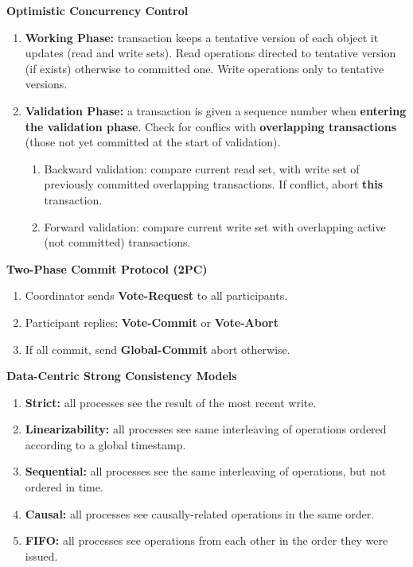 \documentclass[a4paper, 10pt, twocolumn]{article}
\begin{document}
    \textbf{Optimistic Concurrency Control}

    \begin{enumerate}
        \item \textbf{Working Phase:} transaction keeps a tentative version of each object it updates (read and write sets).
            Read operations directed to tentative version (if exists) otherwise to committed one.
            Write operations only to tentative versions.
        \item \textbf{Validation Phase:} a transaction is given a sequence number when \textbf{entering the validation phase}.
            Check for conflics with \textbf{overlapping transactions} (those not yet committed at the start of validation).
            \begin{enumerate}
                \item Backward validation: compare current read set, with write set of previously committed overlapping transactions.
                    If conflict, abort \textbf{this} transaction.
                \item Forward validation: compare current write set with overlapping active (not committed) transactions.
            \end{enumerate}
    \end{enumerate}

    \textbf{Two-Phase Commit Protocol (2PC)}
    \begin{enumerate}
        \item Coordinator sends \textbf{Vote-Request} to all participants.
        \item Participant replies: \textbf{Vote-Commit} or \textbf{Vote-Abort}
        \item If all commit, send \textbf{Global-Commit} abort otherwise.
    \end{enumerate}

    \textbf{Data-Centric Strong Consistency Models}
    \begin{enumerate}
        \item \textbf{Strict:} all processes see the result of the most recent write.
        \item \textbf{Linearizability:} all processes see same interleaving of operations ordered according to a global timestamp.
        \item \textbf{Sequential:} all processes see the same interleaving of operations, but not ordered in time.
        \item \textbf{Causal:} all processes see causally-related operations in the same order.
        \item \textbf{FIFO:} all processes see operations from each other in the order they were issued.
    \end{enumerate}
\end{document}
